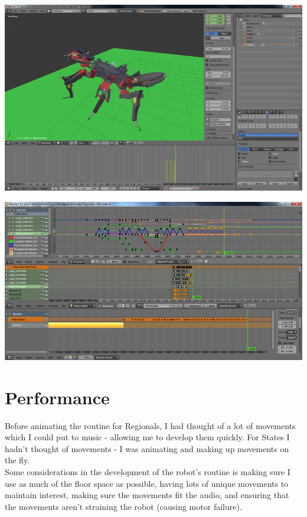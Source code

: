          \centerline{\includegraphics[width=\linewidth]{images/animation}}
          \vspace{10pt}
          \centerline{\includegraphics[width=\linewidth]{images/graph_editor}}
          \vspace{10pt}
          
          
		\section{Performance}
        	Before animating the routine for Regionals, I had thought of a lot of movements which I could put to music - allowing me to develop them quickly. For States I hadn't thought of movements - I was animating and making up movements on the fly.\\
            
			Some considerations in the development of the robot's routine is making sure I use as much of the floor space as possible, having lots of unique movements to maintain interest, making sure the movements fit the audio, and ensuring that the movements aren't straining the robot  (causing motor failure).\\
            
